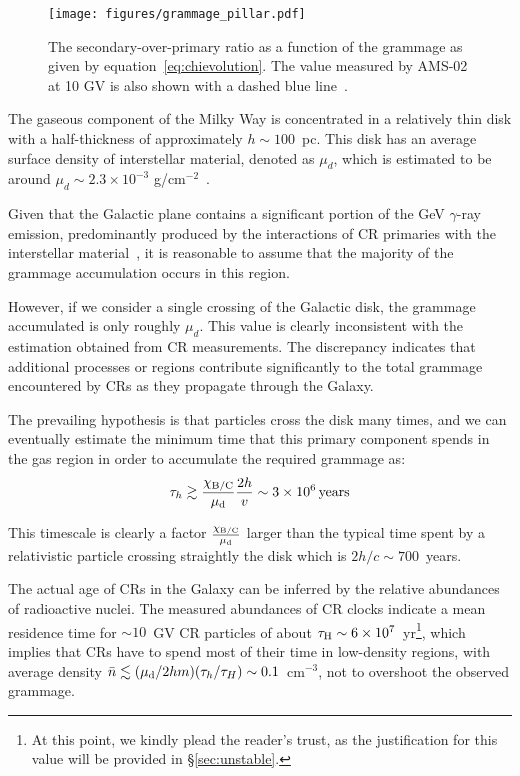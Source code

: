 \begin{figure}
\centering
\texttt{[image: figures/grammage\_pillar.pdf]}    
\caption{The secondary-over-primary ratio as a function of the grammage as given by equation~\eqref{eq:chievolution}. The value measured by AMS-02 at 10 GV is also shown with a dashed blue line~\cite{AMS02results}.}
\label{fig:grammage10gev}
\end{figure}

The gaseous component of the Milky Way is concentrated in a relatively thin disk with a half-thickness of approximately $h \sim 100$~pc. This disk has an average surface density of interstellar material, denoted as $\mu_d$, which is estimated to be around $\mu_d \sim 2.3 \times 10^{-3}$ g/cm$^{-2}$~\cite{Ferriere2001rmp}.

Given that the Galactic plane contains a significant portion of the GeV $\gamma$-ray emission, predominantly produced by the interactions of CR primaries with the interstellar material~\cite{Tibaldo2021universe}, it is reasonable to assume that the majority of the grammage accumulation occurs in this region.

However, if we consider a single crossing of the Galactic disk, the grammage accumulated is only roughly $\mu_d$. This value is clearly inconsistent with the estimation obtained from CR measurements. The discrepancy indicates that additional processes or regions contribute significantly to the total grammage encountered by CRs as they propagate through the Galaxy. 

The prevailing hypothesis is that particles cross the disk many times, and we can eventually estimate the minimum time that this primary component spends in the gas region in order to accumulate the required grammage as: 
%
\begin{equation}
\tau_{h} \gtrsim \frac{\chi_{\rm B/C}}{\mu_{\rm d}} \frac{2 h}{v} \sim 3 \times 10^6 \, \text{years}
\end{equation}

This timescale is clearly a factor $\frac{\chi_{\rm B/C}}{\mu_{\rm d}}$ larger than the typical time spent by a relativistic particle crossing straightly the disk which is $2h/c \sim 700$~years. 

The actual age of CRs in the Galaxy can be inferred by the relative abundances of radioactive nuclei. 
%
The measured abundances of CR clocks indicate a mean residence time for $\sim 10$~GV CR particles of about $\tau_{\rm H} \sim 6 \times 10^7$~yr\footnote{At this point, we kindly plead the reader's trust, as the justification for this value will be provided in \S\ref{sec:unstable}.}, which implies that CRs have to spend most of their time in low-density regions, with average density {$\bar n \lesssim (\mu_{\rm d} / 2h m) (\tau_{h}/\tau_{H}) \sim 0.1$~cm$^{-3}$}, not to overshoot the observed grammage.

